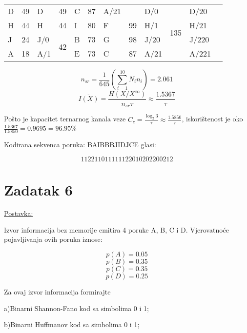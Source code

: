 \documentclass[12pt]{article}
\begin{document}
\begin{table}[hp]
\begin{tabular}{|l|l|l|l|l|l|l|l|l|l|l|l|}
D             & 49            & D       & 49                     & C       & 87                     & A/21    &                        & D/0     & \multirow{4}{*}{135}   & D/20    &                        \\ \cline{1-8}
H             & 44            & H       & 44                     & I       & 80                     & F       & 99                     & H/1     &                        & H/21    &                        \\ \cline{1-8}
J             & 24            & J/0     & \multirow{2}{*}{42}    & B       & 73                     & G       & 98                     & J/20    &                        & J/220   &                        \\ \cline{1-2} \cline{5-8}
A             & 18            & A/1     &                        & E       & 73                     & C       & 87                     & A/21    &                        & A/221   &                        \\ \hline
\end{tabular}
\end{table}

$$n_{sr} = \frac{1}{645} (\sum_{i = 1}^{10} N_i n_i) = 2.061$$
$$\overline{I(X)} = \frac{H(X/X^{\infty}) }{n_{sr} \tau} \approx \frac{1.5367}{\tau}$$

Pošto je kapacitet ternarnog kanala veze $C_c = \frac{\log_{2}3}{\tau} \approx \frac{1.5850}{\tau}$, iskorištenost je oko $\frac{1.5367}{1.5850} = 0.9695 = 96.95\%$

Kodirana sekvenca poruka: BAIBBBJIDJCE glasi:

$$112211011111122010202200212$$


\newpage

\section*{Zadatak 6\label{Z6}}

\underline{Postavka:}

Izvor informacija bez memorije emitira 4 poruke A, B, C i D. Vjerovatnoće pojavljivanja ovih poruka iznose:

$$p(A) = 0.05$$
$$p(B) = 0.35$$
$$p(C) = 0.35$$
$$p(D) = 0.25$$

Za ovaj izvor informacija formirajte

a)Binarni Shannon-Fano kod sa simbolima 0 i 1;

b)Binarni Huffmanov kod sa simbolima 0 i 1;
\end{document}
